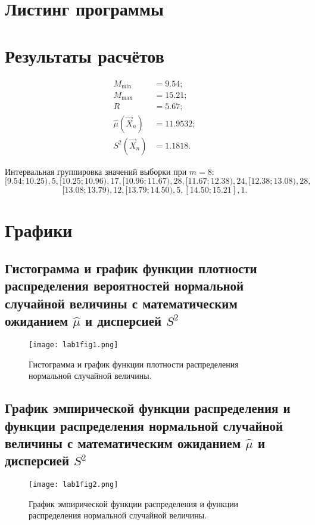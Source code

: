 \documentclass[a4paper, 12pt]{article}
\theoremstyle{definition}
\newcommand{\biglisting}[1]{%
}
\begin{document}
\section{Листинг программы}

\biglisting{lab1.m}


\section{Результаты расчётов}

\begin{align*}
M_{\min} &= 9.54; \\
M_{\max} &= 15.21; \\
R &= 5.67; \\
\hat{\mu}(\vec{X}_n) &= 11.9532; \\
S^2(\vec{X}_n) &= 1.1818.
\end{align*}

\noindent 
Интервальная группировка значений выборки при $m = 8$:
\[
[9.54;10.25), 5 ,	[10.25;10.96), 17,	[10.96;11.67) ,28,	[11.67;12.38), 24,	[12.38;13.08), 28,
\]
\[
[13.08;13.79), 12,	[13.79;14.50), 5,	[14.50;15.21], 1.
\]



\section{Графики}

\subsection{Гистограмма и график функции плотности распределения вероятностей нормальной случайной величины с математическим ожиданием $\hat{\mu}$ и дисперсией $S^2$}


\begin{figure}[h]
	\centering
	\texttt{[image: lab1fig1.png]}
	\caption{Гистограмма и график функции плотности распределения нормальной случайной величины.}
\end{figure}



\newpage
\subsection{График эмпирической функции распределения и функции распределения нормальной случайной величины с математическим ожиданием $\hat{\mu}$ и дисперсией $S^2$}

\begin{figure}[h]
	\centering
	\texttt{[image: lab1fig2.png]}
	\caption{График эмпирической функции распределения и функции распределения нормальной случайной величины.}
\end{figure}
\end{document}
